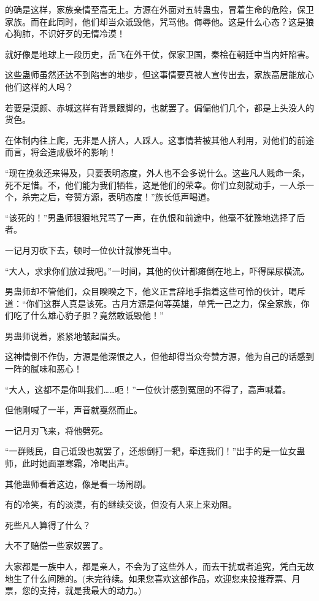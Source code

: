 \begin{this_body}
的确是这样，家族亲情至高无上。方源在外面对五转蛊虫，冒着生命的危险，保卫家族。而在此同时，他们却当众诋毁他，咒骂他。侮辱他。这是什么心态？这是狼心狗肺，不识好歹的无情冷漠！

就好像是地球上一段历史，岳飞在外干仗，保家卫国，秦桧在朝廷中当内奸陷害。

这些蛊师虽然还达不到陷害的地步，但这事情要真被人宣传出去，家族高层能放心他们这样的人吗？

若要是漠颜、赤城这样有背景跟脚的，也就罢了。偏偏他们几个，都是上头没人的货色。

在体制内往上爬，无非是人挤人，人踩人。这事情若被其他人利用，对他们的前途而言，将会造成极坏的影响！

“现在挽救还来得及，只要表明态度，外人也不会多说什么。这些凡人贱命一条，死不足惜。不，他们能为我们牺牲，这是他们的荣幸。你们立刻就动手，一人杀一个，杀完之后，夸赞方源，表明态度！”族长低声喝道。

“该死的！”男蛊师狠狠地咒骂了一声，在仇恨和前途中，他毫不犹豫地选择了后者。

一记月刃砍下去，顿时一位伙计就惨死当中。

“大人，求求你们放过我吧。”一时间，其他的伙计都瘫倒在地上，吓得屎尿横流。

男蛊师却不管他们，众目睽睽之下，他义正言辞地手指着这些可怜的伙计，喝斥道：“你们这群人真是该死。古月方源是何等英雄，单凭一己之力，保全家族，你们吃了什么雄心豹子胆？竟然敢诋毁他！”

男蛊师说着，紧紧地皱起眉头。

这神情倒不作伪，方源是他深恨之人，但他却得当众夸赞方源，他为自己的话感到一阵的腻味和恶心！

“大人，这都不是你叫我们……呃！”一位伙计感到冤屈的不得了，高声喊着。

但他刚喊了一半，声音就戛然而止。

一记月刃飞来，将他劈死。

“一群贱民，自己诋毁也就罢了，还想倒打一耙，牵连我们！”出手的是一位女蛊师，此时她面罩寒霜，冷喝出声。

其他蛊师看着这边，像是看一场闹剧。

有的冷笑，有的淡漠，有的继续交谈，但没有人来上来劝阻。

死些凡人算得了什么？

大不了赔偿一些家奴罢了。

大家都是一族中人，都是亲人，不会为了这些外人，而去干扰或者追究，凭白无故地生了什么间隙的。(未完待续。如果您喜欢这部作品，欢迎您来投推荐票、月票，您的支持，就是我最大的动力。)


\end{this_body}
